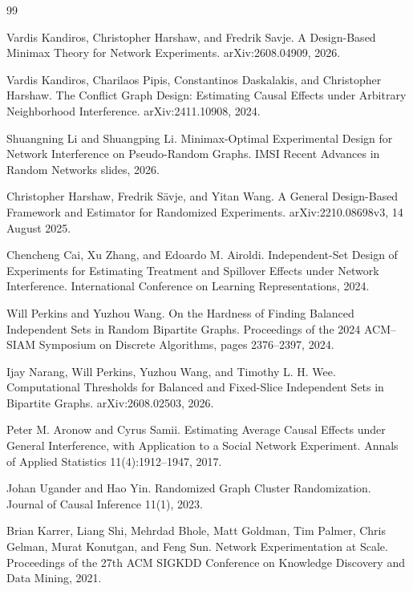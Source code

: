 \documentclass{article}
\begin{document}
\begin{thebibliography}{99}

   Vardis Kandiros, Christopher Harshaw, and Fredrik Savje. A Design-Based Minimax Theory for Network Experiments. arXiv:2608.04909, 2026.

   Vardis Kandiros, Charilaos Pipis, Constantinos Daskalakis, and Christopher Harshaw. The Conflict Graph Design: Estimating Causal Effects under Arbitrary Neighborhood Interference. arXiv:2411.10908, 2024.

   Shuangning Li and Shuangping Li. Minimax-Optimal Experimental Design for Network Interference on Pseudo-Random Graphs. IMSI Recent Advances in Random Networks slides, 2026.

   Christopher Harshaw, Fredrik S\"avje, and Yitan Wang. A General Design-Based Framework and Estimator for Randomized Experiments. arXiv:2210.08698v3, 14 August 2025.

   Chencheng Cai, Xu Zhang, and Edoardo M. Airoldi. Independent-Set Design of Experiments for Estimating Treatment and Spillover Effects under Network Interference. International Conference on Learning Representations, 2024.

   Will Perkins and Yuzhou Wang. On the Hardness of Finding Balanced Independent Sets in Random Bipartite Graphs. Proceedings of the 2024 ACM--SIAM Symposium on Discrete Algorithms, pages 2376--2397, 2024.

   Ijay Narang, Will Perkins, Yuzhou Wang, and Timothy L. H. Wee. Computational Thresholds for Balanced and Fixed-Slice Independent Sets in Bipartite Graphs. arXiv:2608.02503, 2026.

   Peter M. Aronow and Cyrus Samii. Estimating Average Causal Effects under General Interference, with Application to a Social Network Experiment. Annals of Applied Statistics 11(4):1912--1947, 2017.

   Johan Ugander and Hao Yin. Randomized Graph Cluster Randomization. Journal of Causal Inference 11(1), 2023.

   Brian Karrer, Liang Shi, Mehrdad Bhole, Matt Goldman, Tim Palmer, Chris Gelman, Murat Konutgan, and Feng Sun. Network Experimentation at Scale. Proceedings of the 27th ACM SIGKDD Conference on Knowledge Discovery and Data Mining, 2021.


\end{thebibliography}
\end{document}
